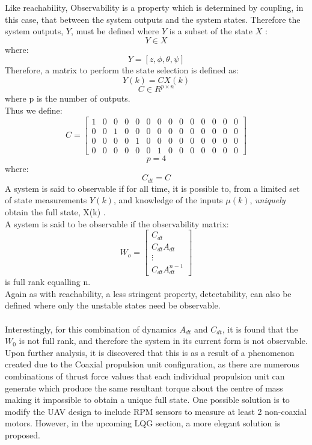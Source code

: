 \documentclass[12pt,a4paper,twoside]{report}
\begin{document}
				Like reachability, Observability is a property which is determined by coupling, in this case, that between the system outputs and the system states. Therefore the system outputs, $Y$, must be defined where $Y$ is a subset of the state $X$ :
				\[
					Y \in X
				\]
				where:
				\begin{equation}
					Y = [z,\phi,\theta,\psi]
				\end{equation}
				Therefore, a matrix to perform the state selection is defined as:
				\\
				\begin{equation}
					Y(k) = CX(k)  
				\end{equation}
				\[
					C \in R^{p \times n}  
				\]
				where p is the number of outputs.
				\\
				Thus we define:
				\setcounter{MaxMatrixCols}{15}
				\begin{equation}
					C =
					\begin{bmatrix}
						1&0&0&0&0&0&0&0&0&0&0&0&0&0 \\
						0&0&1&0&0&0&0&0&0&0&0&0&0&0 \\
						0&0&0&0&1&0&0&0&0&0&0&0&0&0 \\
						0&0&0&0&0&0&1&0&0&0&0&0&0&0
					\end{bmatrix}  
				\end{equation}
				\[
					p = 4  
				\]
				where:
				\[
					C_{dt} = C
				\]
				A system is said to observable if for all time, it is possible to, from a limited set of state measurements $Y(k)$, and knowledge of the inputs $\mu(k)$, \emph{uniquely} obtain the full state, X(k) \cite{18}.
				\\
				A system is said to be observable if the observability matrix:
				\begin{equation}
					W_o = 
					\begin{bmatrix}
						C_{dt}\\
						C_{dt}A_{dt}\\ 
						\vdots \\
						C_{dt}A_{dt}^{n-1}
					\end{bmatrix}
				\end{equation}
				is full rank equalling n.
				\\
				Again as with reachability, a less stringent property, detectability, can also be defined where only the unstable states need be observable.
				\\ \\
				Interestingly, for this combination of dynamics $A_{dt}$ and $C_{dt}$, it is found that the $W_0$ is not full rank, and therefore the system in its current form is not observable. Upon further analysis, it is discovered that this is as a result of a phenomenon created due to the Coaxial propulsion unit configuration, as there are numerous combinations of thrust force values that each individual propulsion unit can generate which produce the same resultant torque about the centre of mass making it impossible to obtain a unique full state. One possible solution is to modify the UAV design to include RPM sensors to measure at least 2 non-coaxial motors. However, in the upcoming LQG section, a more elegant solution is proposed.
		
\end{document}
